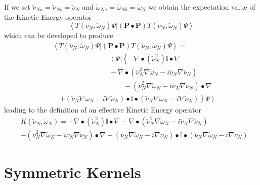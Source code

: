 \documentclass[aps,preprint]{revtex4}%
\begin{document}
If we set $\breve{\nu}_{Na}=\breve{\nu}_{Nb}=\breve{\nu}_{N}$ and
$\breve{\omega}_{Na}=\breve{\omega}_{Nb}=\breve{\omega}_{N}$ we obtain the
expectation value of the Kinetic Energy operator
\begin{equation}
\left\langle T\left(  \breve{\nu}_{N},\breve{\omega}_{N}\right)  \Psi|\left(
\mathbf{P\bullet P}\right)  T\left(  \breve{\nu}_{N},\breve{\omega}%
_{N}\right)  \Psi\right\rangle
\end{equation}
which can be developed to produce
\begin{align}
&  \left\langle T\left(  \breve{\nu}_{N},\breve{\omega}_{N}\right)
\Psi|\left(  \mathbf{P\bullet P}\right)  T\left(  \breve{\nu}_{N}%
,\breve{\omega}_{N}\right)  \Psi\right\rangle =\nonumber\\
&  \qquad\qquad\qquad\qquad\left\langle \Psi\right.  |\left\{  -\nabla
\bullet\left(  \breve{\nu}_{N}^{2}\right)  \mathbb{I}\bullet\nabla\right.
\nonumber\\
&  \qquad\qquad\qquad\qquad-\nabla\bullet\left(  \breve{\nu}_{N}^{2}%
\nabla\breve{\omega}_{N}-i\breve{\nu}_{N}\nabla\breve{\nu}_{N}\right)
\nonumber\\
&  \qquad\qquad\qquad\qquad\qquad-\left(  \breve{\nu}_{N}^{2}\nabla
\breve{\omega}_{N}-i\breve{\nu}_{N}\nabla\breve{\nu}_{N}\right)  \bullet
\nabla\nonumber\\
&  \quad\left.  +\left(  \breve{\nu}_{N}\nabla\breve{\omega}_{N}-i\nabla
\breve{\nu}_{N}\right)  \bullet\mathbb{I}\bullet\left(  \breve{\nu}_{N}%
\nabla\breve{\omega}_{N}-i\nabla\breve{\nu}_{N}\right)  \right\}  \left.
\Psi\right\rangle
\end{align}
leading to the definition of an effective Kinetic Energy operator
\begin{align}
&  K\left(  \breve{\nu}_{N},\breve{\omega}_{N}\right)  =-\nabla\bullet\left(
\breve{\nu}_{N}^{2}\right)  \mathbb{I}\bullet\nabla-\nabla\bullet\left(
\breve{\nu}_{N}^{2}\nabla\breve{\omega}_{N}-i\breve{\nu}_{N}\nabla\breve{\nu
}_{N}\right) \nonumber\\
&  -\left(  \breve{\nu}_{N}^{2}\nabla\breve{\omega}_{N}-i\breve{\nu}_{N}%
\nabla\breve{\nu}_{N}\right)  \bullet\nabla+\left(  \breve{\nu}_{N}%
\nabla\breve{\omega}_{N}-i\nabla\breve{\nu}_{N}\right)  \bullet\mathbb{I}%
\bullet\left(  \breve{\nu}_{N}\nabla\breve{\omega}_{N}-i\nabla\breve{\nu}%
_{N}\right)
\end{align}


\section{Symmetric Kernels\label{symker}}
\end{document}
